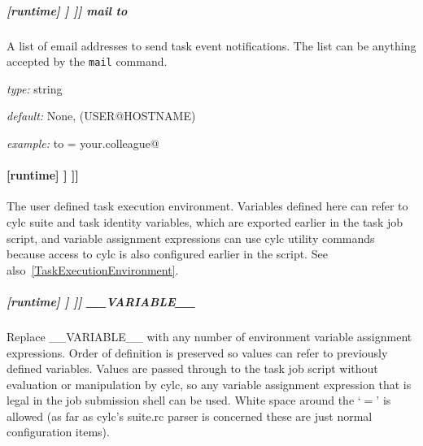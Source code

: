 \subparagraph[mail to]{[runtime] \textrightarrow [[\_\_NAME\_\_]] \textrightarrow [[[events]]] \textrightarrow mail to}

A list of email addresses to send task event notifications. The list can be
anything accepted by the \lstinline=mail= command.

\begin{myitemize}
    \item {\em type:} string
    \item {\em default:} None, (USER@HOSTNAME)
    \item {\em example:} \lstinline@mail to = your.colleague@
\end{myitemize}

\paragraph[{[[[}environment{]]]}]{[runtime] \textrightarrow [[\_\_NAME\_\_]] \textrightarrow [[[environment]]]}

The user defined task execution environment. Variables defined here can
refer to cylc suite and task identity variables, which are exported
earlier in the task job script, and variable assignment expressions can
use cylc utility commands because access to cylc is also configured
earlier in the script.  See also~\ref{TaskExecutionEnvironment}.

\subparagraph[\_\_VARIABLE\_\_ ]{[runtime] \textrightarrow [[\_\_NAME\_\_]] \textrightarrow [[[environment]]] \textrightarrow \_\_VARIABLE\_\_}
\label{AppendixTaskExecutionEnvironment}

Replace \_\_VARIABLE\_\_ with any number of environment variable
assignment expressions.
Order of definition is preserved so values can refer to previously
defined variables. Values are passed through to the task job script
without evaluation or manipulation by cylc, so any variable assignment
expression that is legal in the job submission shell can be used.
White space around the `$=$' is allowed (as far as cylc's suite.rc
parser is concerned these are just normal configuration items).

